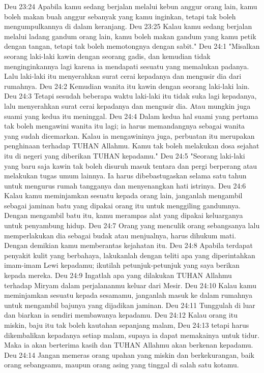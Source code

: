 Deu 23:24  Apabila kamu sedang berjalan melalui kebun anggur orang lain, kamu boleh makan buah anggur sebanyak yang kamu inginkan, tetapi tak boleh mengumpulkannya di dalam keranjang.
Deu 23:25  Kalau kamu sedang berjalan melalui ladang gandum orang lain, kamu boleh makan gandum yang kamu petik dengan tangan, tetapi tak boleh memotongnya dengan sabit."
Deu 24:1  "Misalkan seorang laki-laki kawin dengan seorang gadis, dan kemudian tidak menginginkannya lagi karena ia mendapati sesuatu yang memalukan padanya. Lalu laki-laki itu menyerahkan surat cerai kepadanya dan mengusir dia dari rumahnya.
Deu 24:2  Kemudian wanita itu kawin dengan seorang laki-laki lain.
Deu 24:3  Tetapi sesudah beberapa waktu laki-laki itu tidak suka lagi kepadanya, lalu menyerahkan surat cerai kepadanya dan mengusir dia. Atau mungkin juga suami yang kedua itu meninggal.
Deu 24:4  Dalam kedua hal suami yang pertama tak boleh mengawini wanita itu lagi; ia harus memandangnya sebagai wanita yang sudah dicemarkan. Kalau ia mengawininya juga, perbuatan itu merupakan penghinaan terhadap TUHAN Allahmu. Kamu tak boleh melakukan dosa sejahat itu di negeri yang diberikan TUHAN kepadamu."
Deu 24:5  "Seorang laki-laki yang baru saja kawin tak boleh disuruh masuk tentara dan pergi berperang atau melakukan tugas umum lainnya. Ia harus dibebastugaskan selama satu tahun untuk mengurus rumah tangganya dan menyenangkan hati istrinya.
Deu 24:6  Kalau kamu meminjamkan sesuatu kepada orang lain, janganlah mengambil sebagai jaminan batu yang dipakai orang itu untuk menggiling gandumnya. Dengan mengambil batu itu, kamu merampas alat yang dipakai keluarganya untuk penyambung hidup.
Deu 24:7  Orang yang menculik orang sebangsanya lalu memperlakukan dia sebagai budak atau menjualnya, harus dihukum mati. Dengan demikian kamu memberantas kejahatan itu.
Deu 24:8  Apabila terdapat penyakit kulit yang berbahaya, lakukanlah dengan teliti apa yang diperintahkan imam-imam Lewi kepadamu; ikutilah petunjuk-petunjuk yang saya berikan kepada mereka.
Deu 24:9  Ingatlah apa yang dilakukan TUHAN Allahmu terhadap Miryam dalam perjalananmu keluar dari Mesir.
Deu 24:10  Kalau kamu meminjamkan sesuatu kepada sesamamu, janganlah masuk ke dalam rumahnya untuk mengambil bajunya yang dijadikan jaminan.
Deu 24:11  Tunggulah di luar dan biarkan ia sendiri membawanya kepadamu.
Deu 24:12  Kalau orang itu miskin, baju itu tak boleh kautahan sepanjang malam,
Deu 24:13  tetapi harus dikembalikan kepadanya setiap malam, supaya ia dapat memakainya untuk tidur. Maka ia akan berterima kasih dan TUHAN Allahmu akan berkenan kepadamu.
Deu 24:14  Jangan memeras orang upahan yang miskin dan berkekurangan, baik orang sebangsamu, maupun orang asing yang tinggal di salah satu kotamu.

